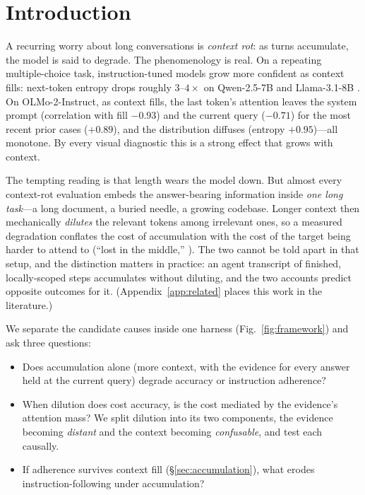 \documentclass{article}
\begin{document}
\section{Introduction}

A recurring worry about long conversations is \emph{context rot}: as turns accumulate, the model
is said to degrade. The phenomenology is real. On a repeating multiple-choice task,
instruction-tuned models grow more confident as context fills: next-token entropy
drops roughly $3$--$4\times$ on Qwen-2.5-7B \citep{qwen2025} and Llama-3.1-8B
\citep{llama3herd}. On OLMo-2-Instruct, as context fills, the last token's attention leaves
the system prompt (correlation with fill $-0.93$) and the current query ($-0.71$) for the most
recent prior cases ($+0.89$), and the distribution diffuses (entropy $+0.95$)---all monotone.
By every visual diagnostic this is a strong effect that grows with context.

The tempting reading is that length wears the model down. But almost every context-rot
evaluation embeds the answer-bearing information inside \emph{one long task}---a long document, a
buried needle, a growing codebase. Longer context then mechanically \emph{dilutes} the relevant
tokens among irrelevant ones, so a measured degradation conflates the cost of accumulation with
the cost of the target being harder to attend to (``lost in the middle,''
\citealp{liu2023lost}). The two cannot be told apart in that setup, and the distinction matters
in practice: an agent transcript of finished, locally-scoped steps accumulates without diluting,
and the two accounts predict opposite outcomes for it. (Appendix~\ref{app:related} places this
work in the literature.)

We separate the candidate causes inside one harness (Fig.~\ref{fig:framework}) and ask three
questions:

\begin{itemize}
  \item[\textbf{RQ1}] Does accumulation alone (more context, with the evidence for every answer
        held at the current query) degrade accuracy or instruction adherence?
  \item[\textbf{RQ2}] When dilution does cost accuracy, is the cost mediated by the evidence's
        attention mass? We split dilution into its two components, the evidence becoming
        \emph{distant} and the context becoming \emph{confusable}, and test each causally.
  \item[\textbf{RQ3}] If adherence survives context fill (\S\ref{sec:accumulation}), what
        erodes instruction-following under accumulation?
\end{itemize}
\end{document}
